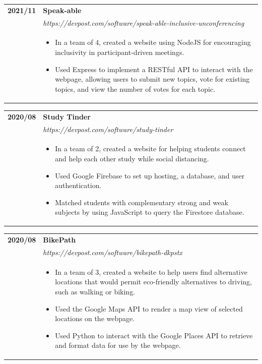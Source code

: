 \documentclass[letterpaper]{article}
\begin{document}
        \begin{tabular}{p{} p{}}
            \textbf{2021/11} & \textbf{Speak-able} \\
            & \emph{https://devpost.com/software/speak-able-inclusive-unconferencing} \\
            & \begin{itemize}
                \item In a team of 4, created a website using NodeJS for encouraging inclusivity in
                    participant-driven meetings.
                \item Used Express to implement a RESTful API to interact with the webpage, allowing
                    users to submit new topics, vote for existing topics, and view the number of votes
                    for each topic.
            \end{itemize}
            \\
        \end{tabular}

        \begin{tabular}{p{} p{}}
            \textbf{2020/08} & \textbf{Study Tinder} \\
            & \emph{https://devpost.com/software/study-tinder} \\
            & \begin{itemize}
                \item In a team of 2, created a website for helping students connect and help each other
                    study while social distancing.
                \item Used Google Firebase to set up hosting, a database, and user authentication.
                \item Matched students with complementary strong and weak subjects by using JavaScript to
                    query the Firestore database.
            \end{itemize}
            \\
        \end{tabular}

        \begin{tabular}{p{} p{}}
            \textbf{2020/08} & \textbf{BikePath} \\
            & \emph{https://devpost.com/software/bikepath-dkpstx} \\
            & \begin{itemize}
                \item In a team of 3, created a website to help users find alternative locations that
                    would permit eco-friendly alternatives to driving, such as walking or biking.
                \item Used the Google Maps API to render a map view of selected locations on the webpage.
                \item Used Python to interact with the Google Places API to retrieve and format data for
                    use by the webpage.
            \end{itemize}
            \\
        \end{tabular}
\end{document}
